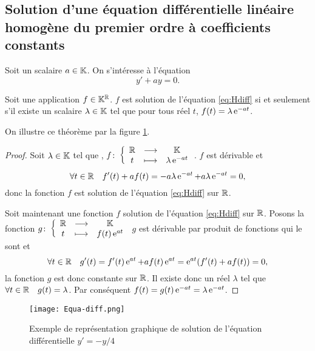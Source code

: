 \subsection[Solution équation homogène coefficients constants]{Solution d'une équation différentielle linéaire homogène du premier ordre à coefficients constants}
\label{subsec:solutioneqdifflinhomog1coefconstants}
Soit un scalaire \(a \in \mathbb{K}\). On s'intéresse à l'équation 
\begin{equation}
\label{eq:Hdiff}
y'+ay=0.
\end{equation}
%
\begin{theo}
\label{theo:1}
Soit une application \(f \in \mathbb{K}^{\mathbb{R}}\). \(f\) est solution de l'équation \eqref{eq:Hdiff} si et seulement s'il existe un scalaire \(\lambda \in \mathbb{K}\) tel que pour tous réel \(t\), \(f(t)=\lambda \operatorname{e}^{-at}\).
\end{theo}
On illustre ce théorème par la figure \ref{fig:eqdiff1}.
\begin{proof}
Soit \(\lambda \in \mathbb{K}\) tel que , \(f\colon \left\{\begin{array}{ccc} \mathbb{R} & \longrightarrow &\mathbb{K}\\ t & \longmapsto & \lambda \operatorname{e}^{-at} \end{array} \right.\). \(f\) est dérivable et
\begin{equation}
\forall t \in \mathbb{R} \quad f'(t)+af(t)=-a \lambda \operatorname{e}^{-at}+a \lambda \operatorname{e}^{-at}=0,
\end{equation}
donc la fonction \(f\) est solution de l'équation \eqref{eq:Hdiff} sur \(\mathbb{R}\). 

Soit maintenant une fonction \(f\) solution de l'équation \eqref{eq:Hdiff} sur \(\mathbb{R}\). Posons la fonction \(g\colon \left\{\begin{array}{ccc} \mathbb{R} & \longrightarrow &\mathbb{K}\\ t & \longmapsto & f(t)\operatorname{e}^{at} \end{array} \right.\) \(g\) est dérivable par produit de fonctions qui le sont et
\begin{equation}
\forall t \in \mathbb{R} \quad g'(t)=f'(t)\operatorname{e}^{at} + af(t)\operatorname{e}^{at}=\operatorname{e}^{at}(f'(t)+af(t))=0,
\end{equation}
la fonction \(g\) est donc constante sur \(\mathbb{R}\). Il existe donc un réel \(\lambda\) tel que \(\forall t \in \mathbb{R} \quad g(t)=\lambda\). Par conséquent \(f(t)=g(t)\operatorname{e}^{-at}=\lambda \operatorname{e}^{-at}\).
\end{proof}
\begin{figure}[h]
    \centering
    \texttt{[image: Equa-diff.png]}
    \caption{Exemple de représentation graphique de solution de l'équation différentielle \(y' = -y/4\)}
    \label{fig:eqdiff1}
\end{figure}
